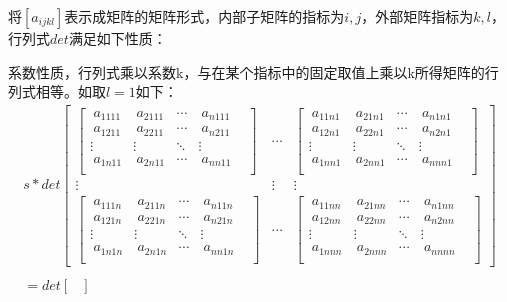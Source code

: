 \documentclass{amsc}          %
\numberwithin{equation}{section} %
\begin{document}
将$[a_{ijkl}]$表示成矩阵的矩阵形式，内部子矩阵的指标为$i,j$，外部矩阵指标为$k,l$，行列式$det$满足如下性质：
\begin{list}{}
{
\setlength{\rightmargin}{\leftmargin}}
\item
系数性质，行列式乘以系数k，与在某个指标中的固定取值上乘以k所得矩阵的行列式相等。如取$l=1$如下：
\begin{align*}
s*det
  \begin{bmatrix}
  \begin{bmatrix}
  \  a_{1111}&\  a_{2111}&\cdots&\  a_{n111}\\
 \  a_{1211}&\  a_{2211}&\cdots&\  a_{n211}\\
  \vdots&\vdots&\ddots &\vdots& \\
\  a_{1n11}&\  a_{2n11}&\cdots&\  a_{nn11}\\
 \end{bmatrix}&
\cdots&
\begin{bmatrix}
\  a_{11n1}&\  a_{21n1}&\cdots&\  a_{n1n1}\\
\  a_{12n1}&\  a_{22n1}&\cdots&\  a_{n2n1}\\
  \vdots&\vdots&\ddots &\vdots& \\
\  a_{1nn1}&\  a_{2nn1}&\cdots&\  a_{nnn1}\\
\end{bmatrix}\\
\vdots&\vdots&\vdots\\
\begin{bmatrix}
\  a_{111n}& \  a_{211n}&\cdots&\  a_{n11n}\\
\  a_{121n}& \  a_{221n}&\cdots&\  a_{n21n}\\
  \vdots&\vdots&\ddots &\vdots& \\
\  a_{1n1n}& \  a_{2n1n}&\cdots& \  a_{nn1n}\\
\end{bmatrix}&
\cdots&
\begin{bmatrix}
\  a_{11nn}& \  a_{21nn}&\cdots&\  a_{n1nn}\\
\  a_{12nn}& \  a_{22nn}&\cdots&\  a_{n2nn}\\
  \vdots&\vdots&\ddots &\vdots& \\
\  a_{1nnn}& \  a_{2nnn}&\cdots&\  a_{nnnn}\\
\end{bmatrix}
\end{bmatrix}\\
\\
=det
  \begin{bmatrix}

\end{bmatrix}
\end{align*}
\end{list}
\end{document}
